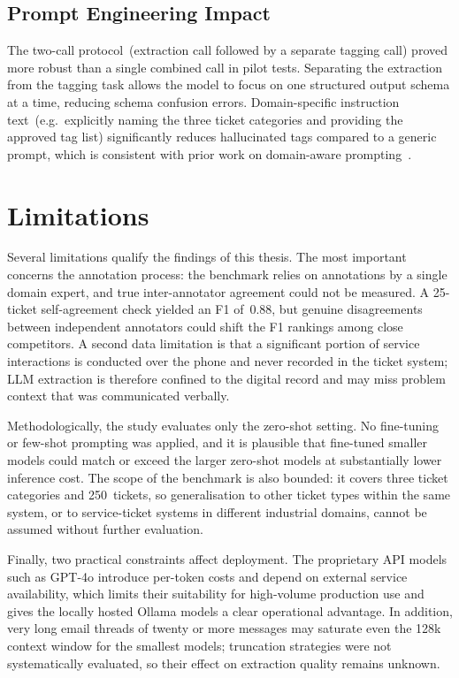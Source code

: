 \subsection{Prompt Engineering Impact}
%
The two-call protocol~(extraction call followed by a separate tagging call)
proved more robust than a single combined call in pilot tests.  Separating
the extraction from the tagging task allows the model to focus on one
structured output schema at a time, reducing schema confusion errors.
Domain-specific instruction text~(e.g.\ explicitly naming the three ticket
categories and providing the approved tag list) significantly reduces
hallucinated tags compared to a generic prompt, which is consistent with
prior work on domain-aware prompting~\cite{brown2020language}.

\section{Limitations}
\label{sec:limitations}
%
Several limitations qualify the findings of this thesis.  The most important
concerns the annotation process: the benchmark relies on annotations by a
single domain expert, and true inter-annotator agreement could not be measured.
A 25-ticket self-agreement check yielded an F1 of~0.88, but genuine
disagreements between independent annotators could shift the F1 rankings among
close competitors.  A second data limitation is that a significant portion of
service interactions is conducted over the phone and never recorded in the
ticket system; LLM extraction is therefore confined to the digital record and
may miss problem context that was communicated verbally.

Methodologically, the study evaluates only the zero-shot setting.  No
fine-tuning or few-shot prompting was applied, and it is plausible that
fine-tuned smaller models could match or exceed the larger zero-shot models at
substantially lower inference cost.  The scope of the benchmark is also bounded:
it covers three ticket categories and 250~tickets, so generalisation to other
ticket types within the same system, or to service-ticket systems in different
industrial domains, cannot be assumed without further evaluation.

Finally, two practical constraints affect deployment.  The proprietary API
models such as GPT-4o introduce per-token costs and depend on external service
availability, which limits their suitability for high-volume production use and
gives the locally hosted Ollama models a clear operational advantage.  In
addition, very long email threads of twenty or more messages may saturate even
the 128k context window for the smallest models; truncation strategies were not
systematically evaluated, so their effect on extraction quality remains
unknown.
